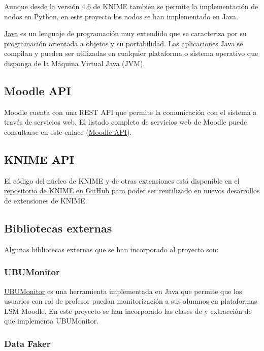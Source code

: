Aunque desde la versión 4.6 de KNIME también se permite la implementación de nodos en Python, en este proyecto los nodos se 
han implementado en Java. 
\

\href{https://www.java.com/}{Java} es un lenguaje de programación muy extendido que se caracteriza por su programación orientada a objetos y su portabilidad. Las 
aplicaciones Java se compilan y pueden ser utilizadas en cualquier plataforma o sistema operativo que disponga de la Máquina 
Virtual Java (JVM).

\subsection{Moodle API}

Moodle cuenta con una REST API que permite la comunicación con el sistema a través de servicios web. El listado completo de servicios
web de Moodle puede consultarse en este enlace (\href{https://docs.moodle.org/dev/Web_service_API_functions}{Moodle API}). 


\subsection{KNIME API}

El código del núcleo de KNIME y de otras extensiones está disponible en el \href{https://github.com/knime/}{repositorio de KNIME en GitHub} para poder ser reutilizado en nuevos desarrollos de extensiones
de KNIME. 

\subsection{Bibliotecas externas}

Algunas bibliotecas externas que se han incorporado al proyecto son: 

\subsubsection{UBUMonitor}

\href{https://github.com/yjx0003/UBUMonitor}{UBUMonitor} es una herramienta implementada en Java que permite que los usuarios con 
rol de profesor puedan monitorización a sus alumnos en plataformas LSM Moodle. En este proyecto se han incorporado las clases de  y
 extracción de  que implementa UBUMonitor.

\subsubsection{Data Faker}

